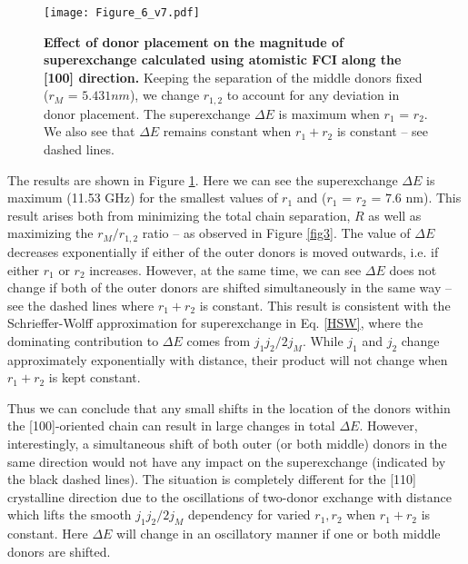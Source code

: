 \documentclass[%
showkeys,
 amsmath,amssymb,
 aps,
prb,
]{revtex4-2}
\begin{document}
\begin{figure}[htb!]
    \centering
    \texttt{[image: Figure\_6\_v7.pdf]}
    \caption{\textbf{Effect of donor placement on the magnitude of superexchange calculated using atomistic FCI along the [100] direction.} Keeping the separation of the middle donors fixed ($r_M$ = $5.431nm$), we change $r_{1,2}$ to account for any deviation in donor placement. The superexchange $\Delta E$ is maximum when $r_1$ = $r_2$. We also see that $\Delta E$ remains constant when $r_1 + r_2$ is constant -- see dashed lines.}
    \label{fig4}
\end{figure}
The results are shown in Figure \ref{fig4}. Here we can see the superexchange $\Delta E$ is maximum (11.53 GHz) for the smallest values of $r_1$ and ($r_1$ = $r_2$ = $7.6$ nm). This result arises both from minimizing the total chain separation, $R$ as well as maximizing the $r_M/r_{1,2}$ ratio -- as observed in Figure \ref{fig3}. The value of $\Delta E$ decreases exponentially if either of the outer donors is moved outwards, i.e. if either $r_1$ or $r_2$ increases. However, at the same time, we can see $\Delta E$ does not change if both of the outer donors are shifted simultaneously in the same way -- see the dashed lines where $r_1+r_2$ is constant. This result is consistent with the Schrieffer-Wolff approximation for superexchange in Eq. \ref{HSW}, where the dominating contribution to $\Delta E$ comes from $j_1j_2/2j_M$. While $j_1$ and $j_2$ change approximately exponentially with distance, their product will not change when $r_1+r_2$ is kept constant. 

Thus we can conclude that any small shifts in the location of the donors within the [100]-oriented chain can result in large changes in total $\Delta E$. However, interestingly, a simultaneous shift of both outer (or both middle) donors in the same direction would not have any impact on the superexchange (indicated by the black dashed lines). The situation is completely different for the [110] crystalline direction due to the oscillations of two-donor exchange with distance which lifts the smooth $j_1j_2/2j_M$ dependency for varied $r_1,r_2$ when $r_1+r_2$ is constant. Here $\Delta E$ will change in an oscillatory manner if one or both middle donors are shifted.
\end{document}
